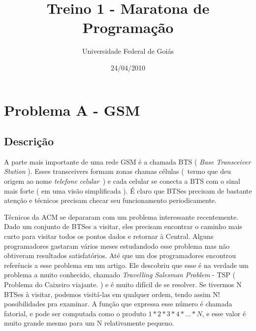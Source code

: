 \documentclass[14pt]{article}
\title{Treino 1 - Maratona de Programa\c{c}\~ao }
\author{Universidade Federal de Goi\'as}
\date{24/04/2010}                                           %
\begin{document}
\maketitle




\section{Problema A - GSM}

\subsection{Descri\c{c}\~ao}

A parte mais importante de uma rede GSM \'e a chamada BTS ( \emph{ Base Transceiver Station} ). Esses transceivers formam zonas chamas c\'elulas (\ termo que deu origem ao nome \emph{telefone celular}\ ) e cada celular se conecta a BTS com o sinal mais forte ( em uma vis\~ao simplificada ). \'E claro que BTSes precisam de bastante aten\c{c}\~ao e t\'ecnicos precisam checar seu funcionamento periodicamente.

T\'ecnicos da ACM se depararam com um problema interessante recentemente. Dado um conjunto de BTSes a visitar, eles precisam encontrar o caminho mais curto para visitar todos os pontos dados e retornar \`a Central. Alguns programadores gastaram v\'arios meses estudandodo esse problema mas n\~ao obtiveram resultados satisfat\'orios. At\'e que um dos programadores encontrou refer\^encis a esse problema em um artigo. Ele descobriu que esse \'e na verdade um problema a muito conhecido, chamado \emph{ Travelling Salesman Problem } - TSP ( Problema do Caixeiro viajante. ) e \'e muito dif\'icil de se resolver. Se tivermos N BTSes \`a visitar,  podemos visit\'a-las em qualquer ordem, tendo assim N! possibilidades pra examinar. A fun\c{c}\~ao que expressa esse n\'umero \'e chamada fatorial, e pode ser computada como o produto $1*2*3*4*...*N$, e esse valor \'e muito grande mesmo para um N relativamente pequeno.
\end{document}
